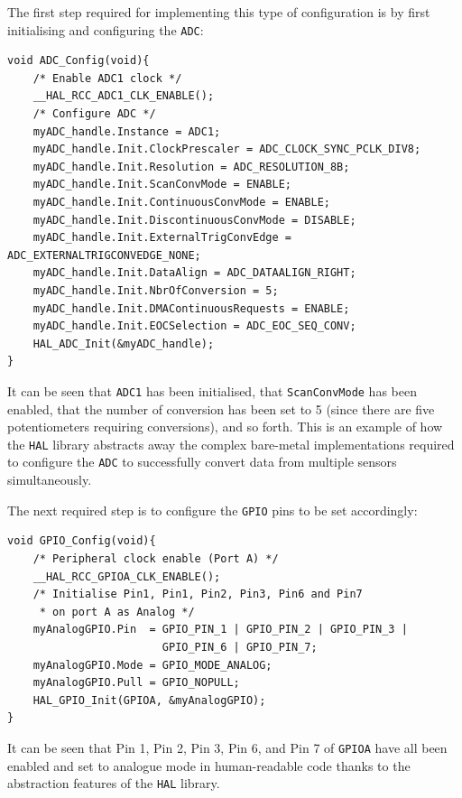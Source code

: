 \documentclass[12pt]{article}
\begin{document}
The first step required for implementing this type of configuration is by first initialising and configuring the \texttt{ADC}:
\begin{verbatim}
void ADC_Config(void){
    /* Enable ADC1 clock */
    __HAL_RCC_ADC1_CLK_ENABLE();
    /* Configure ADC */
    myADC_handle.Instance = ADC1;
    myADC_handle.Init.ClockPrescaler = ADC_CLOCK_SYNC_PCLK_DIV8;
    myADC_handle.Init.Resolution = ADC_RESOLUTION_8B;
    myADC_handle.Init.ScanConvMode = ENABLE;
    myADC_handle.Init.ContinuousConvMode = ENABLE;
    myADC_handle.Init.DiscontinuousConvMode = DISABLE;
    myADC_handle.Init.ExternalTrigConvEdge =  ADC_EXTERNALTRIGCONVEDGE_NONE;
    myADC_handle.Init.DataAlign = ADC_DATAALIGN_RIGHT;
    myADC_handle.Init.NbrOfConversion = 5;
    myADC_handle.Init.DMAContinuousRequests = ENABLE;
    myADC_handle.Init.EOCSelection = ADC_EOC_SEQ_CONV;
    HAL_ADC_Init(&myADC_handle);
}
\end{verbatim}
It can be seen that \texttt{ADC1} has been initialised, that \texttt{ScanConvMode} has been enabled, that the number of conversion has been set to 5 (since there are five potentiometers requiring conversions), and so forth. This is an example of how the \texttt{HAL} library abstracts away the complex bare-metal implementations required to configure the \texttt{ADC} to successfully convert data from multiple sensors simultaneously.

The next required step is to configure the \texttt{GPIO} pins to be set accordingly:
\begin{verbatim}
void GPIO_Config(void){
    /* Peripheral clock enable (Port A) */
    __HAL_RCC_GPIOA_CLK_ENABLE();
    /* Initialise Pin1, Pin1, Pin2, Pin3, Pin6 and Pin7 
     * on port A as Analog */
    myAnalogGPIO.Pin  = GPIO_PIN_1 | GPIO_PIN_2 | GPIO_PIN_3 |
                        GPIO_PIN_6 | GPIO_PIN_7;
    myAnalogGPIO.Mode = GPIO_MODE_ANALOG;
    myAnalogGPIO.Pull = GPIO_NOPULL;
    HAL_GPIO_Init(GPIOA, &myAnalogGPIO);
}
\end{verbatim}
It can be seen that Pin 1, Pin 2, Pin 3, Pin 6, and Pin 7 of \texttt{GPIOA} have all been enabled and set to analogue mode in human-readable code thanks to the abstraction features of the \texttt{HAL} library.
\end{document}
